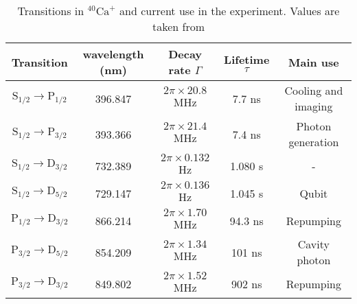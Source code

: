 \begin{table}[H]
\centering
\begin{tabular}{c c c c c}
 \toprule
    {Transition} & {wavelength (nm)} & {Decay rate $\Gamma$} & Lifetime $\tau$ & {Main use} \\ \midrule
   $\text{S}_{1/2} \to \text{P}_{1/2}$ & 396.847 & $2\pi \times 20.8$ MHz & 7.7 ns &  Cooling and imaging \\
    $\text{S}_{1/2} \to \text{P}_{3/2}$  & 393.366 & $2\pi \times 21.4$ MHz & 7.4 ns & Photon generation\\ \midrule
   $\text{S}_{1/2} \to \text{D}_{3/2}$ & 732.389 & $2\pi \times 0.132$ Hz & 1.080 s & - \\
    $\text{S}_{1/2} \to \text{D}_{5/2}$  & 729.147 & $2\pi \times 0.136$ Hz & 1.045 s   & Qubit  \\\midrule
    $\text{P}_{1/2} \to \text{D}_{3/2}$  & 866.214 &  $2\pi \times 1.70$ MHz  &  94.3 ns  & Repumping \\
    $\text{P}_{3/2} \to \text{D}_{5/2}$  & 854.209 & $2\pi \times 1.34$ MHz & 101 ns  & Cavity photon  \\
    $\text{P}_{3/2} \to \text{D}_{3/2}$  & 849.802 & $2\pi \times 1.52$ MHz  & 902 ns   & Repumping \\ \bottomrule
\end{tabular}
\caption{Transitions in $^{40}\text{Ca}^+$ and current use in the experiment. Values are taken from \cite{ion_spacing,stute}}
\label{transitiontable}
\end{table}




